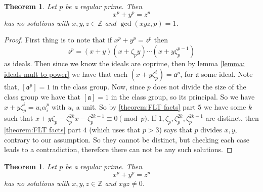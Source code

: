 \documentclass[11pt,a4paper]{amsart}
\theoremstyle{plain}
\newtheorem{theorem}[subsection]{Theorem}
\theoremstyle{definition}
\theoremstyle{definition}
\newcommand{\ZZ}{\mathbb{Z}}
\def \a{\alpha}
\def\gotha{\mathfrak{a}}
\begin{document}
	
	\begin{theorem}\label{theorem:FLT case one}
		Let $p$ be a regular prime. Then \[x^p+y^p=z^p\] has no solutions with $x,y,z \in \ZZ$ and $\gcd(xyz,p)=1$. 
	\end{theorem}
	\begin{proof}
		First thing is to note that if $x^p+y^p=z^p$ then \[z^p=(x+y)(x+\zeta_py)\cdots(x+y\zeta_p^{p-1})\] as ideals. Then since we know the ideals are coprime, then by lemma \ref{lemma: ideals mult to power} we have that each $(x+y\zeta_p^i)=\gotha^p$, for $\gotha$ some ideal. Note that, $[\gotha^p]=1$ in the class group. Now, since $p$ does not divide the size of the class group we have that $[\gotha]=1$ in the class group, so its principal. So we have $x+y\zeta_p^i=u_i\a_i^p$ with $u_i$ a unit. So by \ref{theorem:FLT facts} part $5$ we have some $k$ such that $x+y\zeta_p-\zeta_p^{2k}x-\zeta_p^{2k-1} \equiv 0 \pmod p$. If $1,\zeta_p,\zeta_p^{2k},\zeta_p^{2k-1}$ are distinct, then \ref{theorem:FLT facts} part $4$ (which uses that $p>3$) says that $p$  divides $x,y$, contrary to our assumption. So they cannot be distinct, but checking each case leads to a contradiction, therefore there can not be any such solutions.
	\end{proof}
	
	
	\begin{theorem}\label{FLT regular case}
		Let $p$ be a regular prime.  Then \[x^p+y^p=z^p\] has no solutions with $x,y,z \in \ZZ$ and $xyz \ne 0$. 
	\end{theorem}
	
	
	
	
	
	
	
	
	
	
\end{document}
